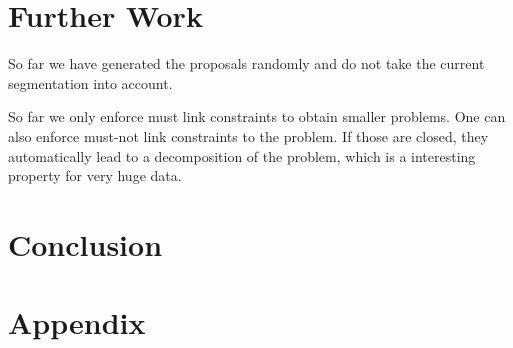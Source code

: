\documentclass[10pt,twocolumn,letterpaper]{article}
\begin{document}
%


\section{Further Work}\label{sec:future}
So far we have generated the proposals randomly and do not take the current segmentation into account.

So far we only enforce must link constraints to obtain smaller problems.
One can also enforce must-not link constraints to the problem. 
If those are closed, they automatically lead to a decomposition of the problem, which is a interesting property for very huge data.


\section{Conclusion}\label{sec:conclusion}

    


\newpage
{\small


}

\newpage
\onecolumn
\section{Appendix}








\end{document}
